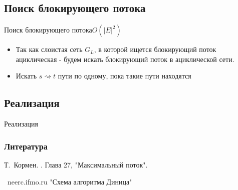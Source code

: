 \documentclass{beamer}
\begin{document}
\subsection{Поиск блокирующего потока}
\begin{frame}{Поиск блокирующего потока}{$O(|E|^{2})$}
    \begin{itemize}
        \item {
            Так как слоистая сеть $G_{L}$, в которой ищется блокирующий поток ациклическая - будем искать блокирующий поток в ациклической сети.
        }
        \item Искать $s \rightsquigarrow t$ пути по одному, пока такие пути находятся
    \end{itemize}

\end {frame}

\subsection{Реализация}
\begin{frame}{Реализация}
\end{frame}

\begin{frame}[allowframebreaks]
  \frametitle<presentation>{Литература}

  \begin{thebibliography}{10}

  \beamertemplatebookbibitems

    Т.~Кормен.
    .
    \newblock Глава 27, "Максимальный поток".


  \beamertemplatearticlebibitems

  \bibitem{}
      ~neerc.ifmo.ru
      \newblock "Схема алгоритма Диница"
  \end{thebibliography}
\end{frame}
\end{document}
